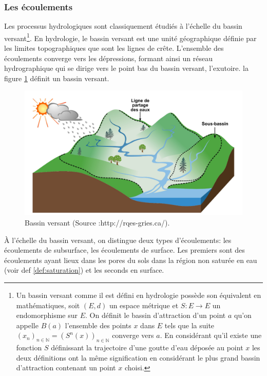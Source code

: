 \documentclass[a4paper,11pt]{article}
\numberwithin{equation}{section}
\begin{document}
\subsubsection{Les écoulements}
\label{ch:ecoulement}

Les processus hydrologiques sont classiquement étudiés à l’échelle du bassin versant\footnote{Un bassin versant comme il est défini en hydrologie possède son équivalent en mathématiques, soit $(E,d)$ un espace métrique et $S:E\to E$ un endomorphisme sur $E$. On définit le bassin d'attraction d'un point $a$ qu'on appelle $B(a)$ l'ensemble des points $x$ dans $E$ tels que la suite $(x_n)_{n \in \mathbb{N}}=(S^n(x))_{n \in \mathbb{N}}$ converge vers $a$. En considérant qu'il existe une fonction $S$ définissant la trajectoire d'une goutte d'eau déposée au point $x$ les deux définitions ont la même signification en considérant le plus grand bassin d'attraction contenant un point $x$ choisi.}. En hydrologie, le bassin versant est une unité géographique définie par les limites topographiques que sont les lignes de crête. L’ensemble des écoulements converge vers les dépressions, formant ainsi un réseau hydrographique qui se dirige vers le point bas du bassin versant, l’exutoire. la figure \ref{fig-Bassin versant} définit un bassin versant. 

\begin{figure}[H]
	\begin{center}
		\includegraphics[scale=0.15]{bassin_versant.png}
	\end{center}
	\caption{Bassin versant (Source :http://rqes-gries.ca/).}
	\label{fig-Bassin versant}
\end{figure}

À l’échelle du bassin versant, on distingue deux types d’écoulements: les écoulements de subsurface, les écoulements de surface. Les premiers sont des écoulements ayant lieux dans les pores du sols dans la région non saturée en eau (voir def \ref{def:saturation}) et les seconds en surface.
\end{document}
